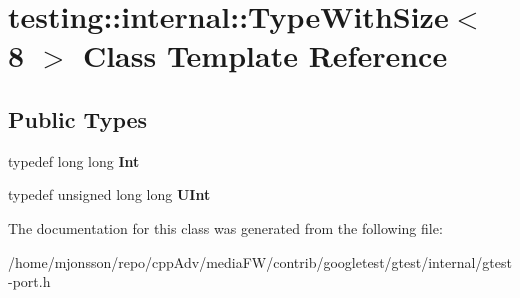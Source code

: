 \hypertarget{classtesting_1_1internal_1_1TypeWithSize_3_018_01_4}{}\section{testing\+:\+:internal\+:\+:Type\+With\+Size$<$ 8 $>$ Class Template Reference}
\label{classtesting_1_1internal_1_1TypeWithSize_3_018_01_4}
\subsection*{Public Types}
\begin{DoxyCompactItemize}
\item 
\mbox{\label{classtesting_1_1internal_1_1TypeWithSize_3_018_01_4_a36d5697e5f5254b0495f13c97d747e36}} 
typedef long long {\bfseries Int}
\item 
\mbox{\label{classtesting_1_1internal_1_1TypeWithSize_3_018_01_4_a747e21c5aee8faf07ec65cd4c3d1ca62}} 
typedef unsigned long long {\bfseries U\+Int}
\end{DoxyCompactItemize}


The documentation for this class was generated from the following file\+:\begin{DoxyCompactItemize}
\item 
/home/mjonsson/repo/cpp\+Adv/media\+F\+W/contrib/googletest/gtest/internal/gtest-\/port.\+h\end{DoxyCompactItemize}
